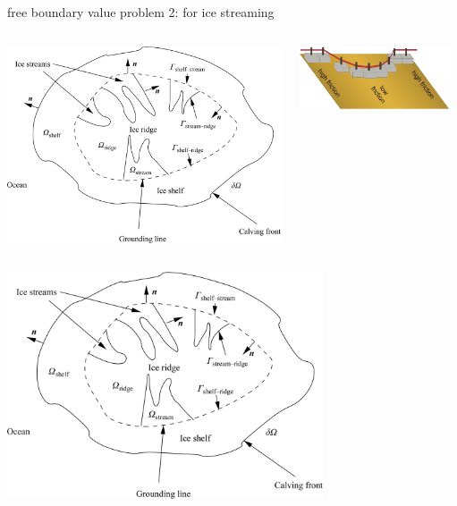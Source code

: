 \begin{frame}{free boundary value problem 2: for ice streaming}
{
\begin{columns}
\begin{column}{0.5\textwidth}
\begin{center}
  \includegraphics[width=1.0\textwidth]{photos/schoof_planform}
\end{center}
\end{column}
\begin{column}{0.5\textwidth}
\begin{center}
  \includegraphics[width=0.95\textwidth]{photos/schoof_sliders}
\end{center}
\end{column}
\end{columns}
}
{
  \includegraphics[width=0.7\textwidth]{photos/schoof_planform} \qquad
}
\end{frame}
